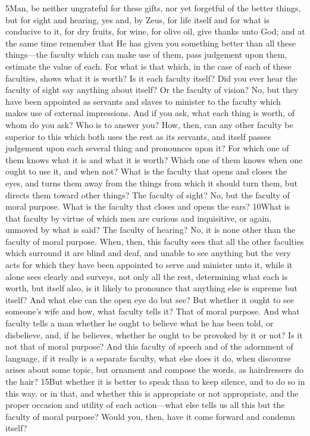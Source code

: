 5Man, be neither ungrateful for these gifts, nor yet forgetful of the better things, but for sight and hearing, yes and, by Zeus, for life itself and for what is conducive to it, for dry fruits, for wine, for olive oil, give thanks unto God; and at the same time remember that He has given you something better than all these things—the faculty which can make use of them, pass judgement upon them, estimate the value of each. For what is that which, in the case of each of these faculties, shows what it is worth? Is it each faculty itself? Did you ever hear the faculty of sight say anything about itself? Or the faculty of vision? No, but they have been appointed as servants and slaves to minister to the faculty which makes use of external impressions. And if you ask, what each thing is worth, of whom do you ask? Who is to answer you? How, then, can any other faculty be superior to this which both uses the rest as its servants, and itself passes judgement upon each several thing and pronounces upon it? For which one of them knows what it is and what it is worth? Which one of them knows when one ought to use it, and when not? What is the faculty that opens and closes the eyes, and turns them away from the things from which it should turn them, but directs them toward other things? The faculty of sight? No, but the faculty of moral purpose. What is the faculty that closes and opens the ears? 10What is that faculty by virtue of which men are curious and inquisitive, or again, unmoved by what is said? The faculty of hearing? No, it is none other than the faculty of moral purpose. When, then, this faculty sees that all the other faculties which surround it are blind and deaf, and unable to see anything but the very acts for which they have been appointed to serve and minister unto it, while it alone sees clearly and surveys, not only all the rest, determining what each is worth, but itself also, is it likely to pronounce that anything else is supreme but itself? And what else can the open eye do but see? But whether it ought to see someone's wife and how, what faculty tells it? That of moral purpose. And what faculty tells a man whether he ought to believe what he has been told, or disbelieve, and, if he believes, whether he ought to be provoked by it or not? Is it not that of moral purpose? And this faculty of speech and of the adornment of language, if it really is a separate faculty, what else does it do, when discourse arises about some topic, but ornament and compose the words, as hairdressers do the hair? 15But whether it is better to speak than to keep silence, and to do so in this way, or in that, and whether this is appropriate or not appropriate, and the proper occasion and utility of each action—what else tells us all this but the faculty of moral purpose? Would you, then, have it come forward and condemn itself?

